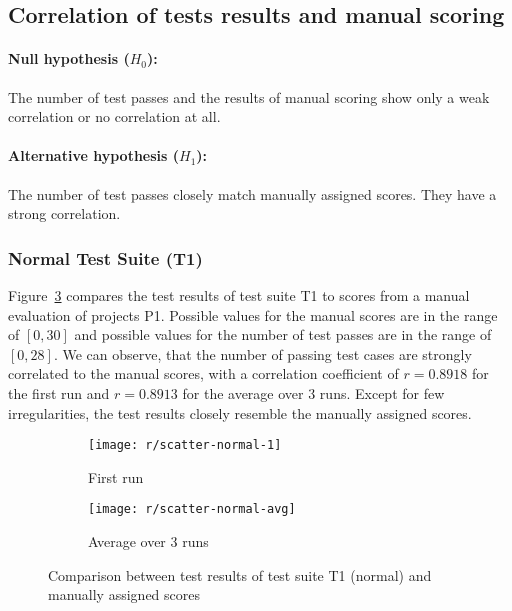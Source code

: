 \subsection{Correlation of tests results and manual scoring}

\paragraph{Null hypothesis ($H_0$):}
The number of test passes and the results of manual scoring show only a weak correlation or no correlation at all.
\vspace{-\medskipamount}
\paragraph{Alternative hypothesis ($H_1$):}
The number of test passes closely match manually assigned scores.
They have a strong correlation.
\parspace

\subsubsection{Normal Test Suite (T1)}

Figure~\ref{fig:scatter_normal} compares the test results of test suite T1 to scores from a manual evaluation of projects P1.
Possible values for the manual scores are in the range of $[0, 30]$ and possible values for the number of test passes are in the range of $[0, 28]$.
We can observe, that the number of passing test cases are strongly correlated to the manual scores,
with a correlation coefficient of $r = 0.8918$ for the first run and $r = 0.8913$ for the average over 3 runs.
Except for few irregularities, the test results closely resemble the manually assigned scores.

\begin{figure}[htpb]
    \centering
    \begin{subfigure}{.40\textwidth}
        \texttt{[image: r/scatter-normal-1]}
        \caption{First run}
        \label{fig:scatter_normal_1}
    \end{subfigure}%
    \begin{subfigure}{.40\textwidth}
        \texttt{[image: r/scatter-normal-avg]}
        \caption{Average over 3 runs}
        \label{fig:scatter_normal_avg}
    \end{subfigure}
    \caption{Comparison between test results of test suite T1 (normal) and manually assigned scores}
    \label{fig:scatter_normal}
\end{figure}


